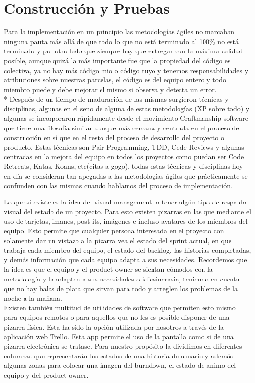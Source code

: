 \documentclass[../pfc.tex]{subfiles}
\begin{document}
	
	\section{Construcción y Pruebas}
	
	Para la implementación en un principio las metodologías ágiles no marcaban ninguna pauta más allá de que todo lo que no está terminado al 100\% no está terminado y por otro lado que siempre hay que entregar con la máxima calidad posible, aunque quizá la más importante fue que la propiedad del código es colectiva, ya no hay más código mio o código tuyo y tenemos responsabilidades y atribuciones sobre nuestras parcelas, el código es del equipo entero y todo miembro puede y debe mejorar el mismo si observa y detecta un error. \\*
	Después de un tiempo de maduración de las mismas surgieron técnicas y disciplinas, algunas en el seno de alguna de estas metodologías (XP sobre todo) y algunas se incorporaron rápidamente desde el movimiento Craftmanship software \cite{manifestocraft} que tiene una filosofía similar aunque más cercana y centrada en el proceso de construcción en sí que en el resto del proceso de desarrollo del proyecto o producto. Estas técnicas son Pair Programming, TDD, Code Reviews y algunas centradas en la mejora del equipo en todos los proyectos como puedan ser Code Retreats, Katas, Koans, etc(citas a gogo). todas estas técnicas y disciplinas hoy en día se consideran tan apegadas a las metodologías ágiles que prácticamente se confunden con las mismas cuando hablamos del proceso de implementación.
	
	Lo que si existe es la idea del visual management, o tener algún tipo de respaldo visual del estado de un proyecto. Para esto existen pizarras en las que mediante el uso de tarjetas, imanes, post its, imágenes e incluso avatares de los miembros del equipo. Esto permite que cualquier persona interesada en el proyecto con solamente dar un vistazo a la pizarra vea el estado del sprint actual, en que trabaja cada miembro del equipo, el estado del backlog, las historias completadas, y demás información que cada equipo adapta a sus necesidades. Recordemos que la idea es que el equipo y el product owner se sientan cómodos con la metodología y la adapten a sus necesidades o idiosincrasia, teniendo en cuenta que no hay balas de plata que sirvan para todo y arreglen los problemas de la noche a la mañana.\\ 
	
	Existen también multitud de utilidades de software que permiten esto mismo para equipos remotos o para aquellos que no les es posible disponer de una pizarra física. Esta ha sido la opción utilizada por nosotros a través de la aplicación web Trello. Esta app permite el uso de la pantalla como si de una pizarra electrónica se tratase. Para nuestro propósito la dividimos en diferentes columnas  que representarán los estados de una historia de usuario y además algunas zonas para colocar una imagen del burndown, el estado de animo del equipo y del product owner.\\
	
\end{document}
